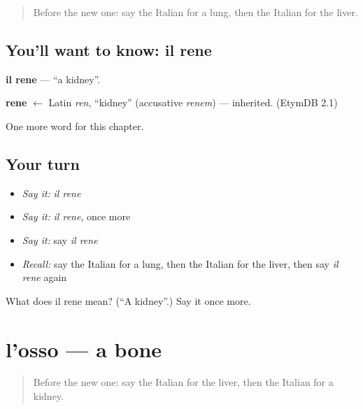 \label{lesson:IT-C151-rene}



\begin{quote}
Before the new one: say the Italian for a lung, then the Italian for the liver.
\end{quote}

\subsection*{You'll want to know: il rene}
\textbf{il rene} — \textquotedblleft{}a kidney\textquotedblright{}.

\begin{cousinweb}
\textbf{rene} $\leftarrow$ Latin \emph{ren}, \textquotedblleft{}kidney\textquotedblright{} (accusative \emph{renem}) — inherited. (EtymDB 2.1)
\end{cousinweb}

\begin{grammarlens}[title={What you've built}]
One more word for this chapter.
\end{grammarlens}

\subsection*{Your turn}
\begin{itemize}
\raggedright
  \item \emph{Say it:} \emph{il rene}
  \item \emph{Say it:} \emph{il rene}, once more
  \item \emph{Say it:} say \emph{il rene}
  \item \emph{Recall:} say the Italian for a lung, then the Italian for the liver, then say \emph{il rene} again
\end{itemize}

\begin{tcolorbox}[breakable,colback=teal!4,colframe=teal!35!black,title={Before you move on}]
What does il rene mean? (\textquotedblleft{}A kidney\textquotedblright{}.) Say it once more.
\end{tcolorbox}
\section[l'osso]{l'osso — a bone}

\label{lesson:IT-C151-osso}



\begin{quote}
Before the new one: say the Italian for the liver, then the Italian for a kidney.
\end{quote}

